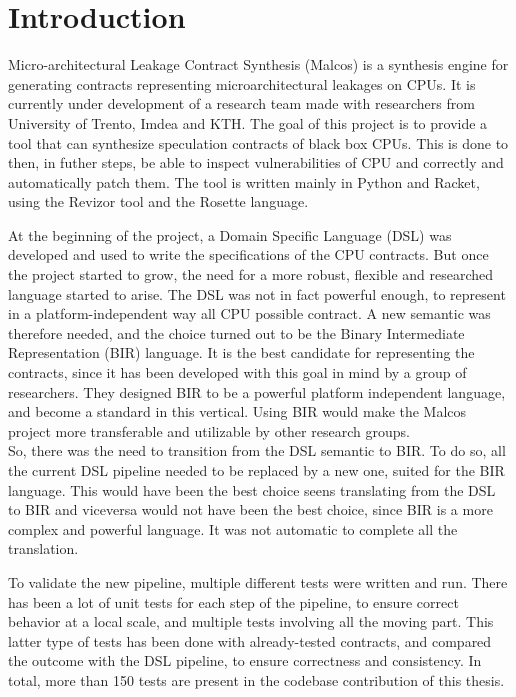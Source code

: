 \chapter{Introduction}
\label{cha:introduction}

Micro-architectural Leakage Contract Synthesis (Malcos) is a synthesis engine
for generating contracts representing microarchitectural leakages on CPUs. It is
currently under development of a research team made with researchers from University
of Trento, Imdea and KTH. The goal of this project is to provide a tool that can
synthesize speculation contracts of black box CPUs. This is done to then, in futher
steps, be able to inspect vulnerabilities of CPU and correctly and automatically
patch them. The tool is written mainly in Python and Racket, using the Revizor
tool and the Rosette language.

At the beginning of the project, a Domain Specific Language (DSL) was developed and
used to write the specifications of the CPU contracts. But once the project
started to grow, the need for a more robust, flexible and researched language
started to arise. The DSL was not in fact powerful enough, to represent in a
platform-independent way all CPU possible contract. A new semantic was therefore
needed, and the choice turned out to be the Binary Intermediate Representation (BIR)
language. It is the best candidate for representing the contracts, since it has
been developed with this goal in mind by a group of researchers. They designed BIR
to be a powerful platform independent language, and become a standard in this
vertical. Using BIR would make the Malcos project more transferable and utilizable
by other research groups. \\

So, there was the need to transition from the DSL semantic to BIR. To do so, all
the current DSL pipeline needed to be replaced by a new one, suited for the BIR language.
This would have been the best choice seens translating from the DSL to BIR and
viceversa would not have been the best choice, since BIR is a more complex and powerful
language. It was not automatic to complete all the translation.

To validate the new pipeline, multiple different tests were written and run.
There has been a lot of unit tests for each step of the pipeline, to ensure correct
behavior at a local scale, and multiple tests involving all the moving part. This
latter type of tests has been done with already-tested contracts, and compared
the outcome with the DSL pipeline, to ensure correctness and consistency. In
total, more than 150 tests are present in the codebase contribution of this thesis.


